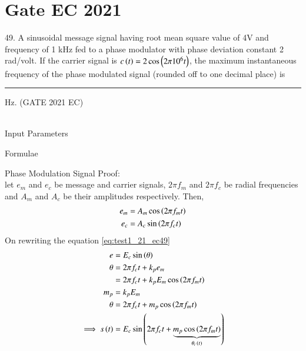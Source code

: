 \documentclass[journal,12pt,twocolumn]{IEEEtran}
\begin{document}


\vspace{3cm}

\title{}
\author{EE23BTECH11054 -  Sai Krishna Shanigarapu$^{*}$
}
\maketitle
\newpage
\bigskip

\section*{Gate EC 2021}
49. \hspace{2pt} A sinusoidal message signal having root mean square value of 4V and frequency of 1 kHz fed to a phase modulator with phase deviation constant 2 rad/volt. If the carrier signal is $c\left(t\right) = 2\cos \left(2\pi 10^6 t\right)$, the maximum instantaneous frequency of the phase modulated signal (rounded off to one decimal place) is \rule{1cm}{0.05mm} Hz. \hfill(GATE 2021 EC)\\
\solution\\
\fi
\begin{table}[ht]
    \centering
    
    \caption{Input Parameters}
    \label{tab:tab1_gate_2021_ec_49}
\end{table}

\begin{table}[ht]
    \centering
    
    \caption{Formulae}
    \label{tab:tab2_gate_2021_ec_49}
\end{table}

Phase Modulation Signal Proof:\\
let $e_m$ and $e_c$ be message and carrier signals, $2\pi f_m$ and $2\pi f_c$ be radial frequencies and $A_m$ and $A_c$ be their amplitudes respectively. Then,
\begin{align}
	e_m &= A_m\cos \left(2\pi f_m t\right)\\
	e_c &= A_c \sin \left(2\pi f_c t\right) \label{eq:test1_21_ec49}
\end{align}
On rewriting the equation \ref{eq:test1_21_ec49}
\begin{align}
	e &= E_c\sin \left(\theta\right)\\
	\theta &= 2\pi f_c t + k_p e_m\\
	&= 2\pi f_c t + k_pE_m\cos \left(2\pi f_m t\right)\\
	m_p &= k_p E_m\\
	\theta &= 2\pi f_c t + m_p\cos \left(2\pi f_m t\right)\\
	\implies s\left(t\right) &= E_c\sin \left(2\pi f_c t + \underbrace{m_p\cos \left(2\pi f_m t\right)}_\text{$\theta_i \left(t\right)$}\right) \label{eq:test2_21_ec49}
\end{align}
\end{document}
